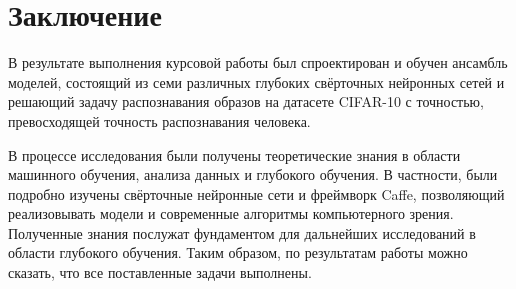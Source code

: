 \section{Заключение}
В результате выполнения курсовой работы был спроектирован и обучен ансамбль моделей,
состоящий из семи различных глубоких свёрточных нейронных сетей и решающий задачу распознавания
образов на датасете CIFAR-10 с точностью, превосходящей точность распознавания человека.

В процессе исследования были получены теоретические знания в области машинного обучения,
анализа данных и глубокого обучения. В частности, были подробно изучены свёрточные нейронные 
сети и фреймворк Caffe, позволяющий реализовывать модели и современные алгоритмы компьютерного 
зрения. Полученные знания послужат фундаментом для дальнейших исследований в области глубокого обучения.
Таким образом, по результатам работы можно сказать, что все поставленные задачи выполнены.


